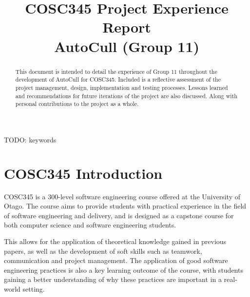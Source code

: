 \documentclass[conference]{IEEEtran}
\begin{document}
\title{COSC345 Project Experience Report\\
{\footnotesize AutoCull (Group 11)}
}

\author{
\and
{}
\and
{}
\and
{}
\and
{}
}

\maketitle

\begin{abstract}
This document is intended to detail the experience of Group 11 throughout the development of AutoCull for COSC345. Included is a reflective assessment of the project management, design, implementation and testing processes. Lessons learned and recommendations for future iterations of the project are also discussed. Along with personal contributions to the project as a whole.

\end{abstract}

\begin{IEEEkeywords}
TODO: keywords
\end{IEEEkeywords}

\section{COSC345 Introduction}
COSC345 is a 300-level software engineering course offered at the University of Otago. The course aims to provide students with practical experience in the field of software engineering and delivery, and is designed as a capstone course for both computer science and software engineering students.

This allows for the application of theoretical knowledge gained in previous papers, as well as the development of soft skills such as teamwork, communication and project management. The application of good software engineering practices is also a key learning outcome of the course, with students gaining a better understanding of why these practices are important in a real-world setting.
\end{document}
